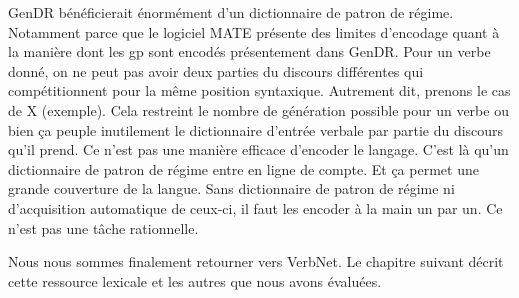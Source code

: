 GenDR bénéficierait énormément d'un dictionnaire de patron de régime. Notamment parce que le logiciel MATE présente des limites d'encodage quant à la manière dont les gp sont encodés présentement dans GenDR. Pour un verbe donné, on ne peut pas avoir deux parties du discours différentes qui compétitionnent pour la même position syntaxique. Autrement dit, prenons le cas de X (exemple). Cela restreint le nombre de génération possible pour un verbe ou bien ça peuple inutilement le dictionnaire d'entrée verbale par partie du discours qu'il prend. Ce n'est pas une manière efficace d'encoder le langage. C'est là qu'un dictionnaire de patron de régime entre en ligne de compte. Et ça permet une grande couverture de la langue. Sans dictionnaire de patron de régime ni d'acquisition automatique de ceux-ci, il faut les encoder à la main un par un. Ce n'est pas une tâche rationnelle.

Nous nous sommes finalement retourner vers VerbNet. Le chapitre suivant décrit cette ressource lexicale et les autres que nous avons évaluées.